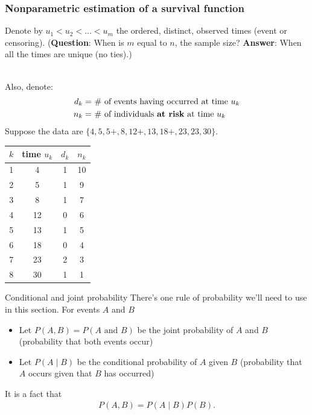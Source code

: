 \documentclass[10pt,t]{beamer}
\begin{document}
\begin{frame}
\frametitle{Nonparametric estimation of a survival function}
\vspace{-0.8cm}
Denote by $u_1 < u_2 < \dots < u_m$ the ordered, distinct, observed times (event or censoring). (\textbf{Question}: When is $m$ equal to $n$, the sample size? \pause \textbf{Answer}: When all the times are unique (no ties).)\pause 
\\ ~\

Also, denote: 
\begin{align*}
d_k = & \ \text{\# of events having occurred at time $u_k$} \\
n_k = & \ \text{\# of individuals \textbf{at risk} at time $u_k$}
\end{align*}
Suppose the data are $\{4, 5, 5+, 8, 12+, 13, 18+, 23, 23, 30\}$.\pause 

\begin{center}
\begin{tabular}{|c|c|c|c|}
\hline
$k$ & time $u_k$ & $d_k$ & $n_k$ \\
\hline
1 & 4 & 1 & 10 \\
2& 5 & 1 & 9 \\
3& 8 & 1 & 7 \\
4&12 & 0 & 6 \\
5&13 & 1 & 5 \\
6&18 & 0 & 4 \\
7&23 & 2 & 3 \\
8&30 & 1 & 1 \\
\hline
\end{tabular}
\end{center}
\end{frame}

\begin{frame}{Conditional and joint probability}
	There's one rule of probability we'll need to use in this section. For events $A$ and $B$
	\begin{itemize}
		\item Let $P(A, B) = P(A \text{ and } B)$ be the joint probability of $A$ and $B$ (probability that both events occur)
		\item Let $P(A \mid B)$ be the conditional probability of $A$ given $B$ (probability that $A$ occurs given that $B$ has occurred)
	\end{itemize}
	It is a fact that
	\begin{align*}
		P(A, B) = P(A \mid B)P(B).
	\end{align*}
\end{frame}
\end{document}
